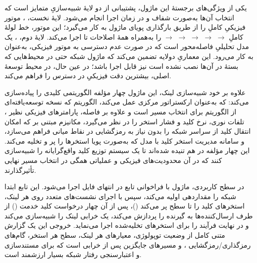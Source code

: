 یکی از ویژگی‌های برجستهٔ این ماژول، پشتیبانی از دو لایهٔ شبیه‌سازیِ متمایز است که انتخاب آن‌ها به‌صورت شفاف و در زمان اجرا انجام می‌شود. لایهٔ نخست، ، موتور فیزیکیِ کاملِ  را از طریق بارگذاری پویای ماژول  به کار می‌گیرد؛ این موتور، خط لولهٔ کاملِ  $\to$  $\to$  $\to$  $\to$  $\to$  را به‌همراه همهٔ اصلاحات  تا  اجرا می‌کند. لایهٔ دوم، ، یک مدل تحلیلیِ فاصله‌محور است که در صورت عدم دسترسی به موتور فیزیکی، به‌عنوان  به کار می‌رود. این معماریِ دولایه تضمین می‌کند که ماژول شبکه حتی در محیط‌هایی که بستهٔ  در آن‌ها نصب نشده است نیز قابل اجرا باشد؛ در عین حال، در محیط توسعهٔ اصلی، بیشترین دقت فیزیکیِ در دسترس را فراهم می‌کند.



علاوه بر خود شبیه‌سازی لینک، این ماژول چهار مؤلفه الگوریتمی کلیدی را پیاده‌سازی می‌کند:  که به‌عنوان ارکستراتور مرکزی عمل می‌کند، الگوریتم  که نسخه توسعه‌یافته‌ای از الگوریتم  برای انتخاب مسیر است و علاوه بر فاصله، پارامترهای فیزیکی نظیر ، تلفات نوری، نرخ کلید و فشار استخر را در نظر می‌گیرد، مکانیزم  مبتنی بر  که امکان انتقال کلید از سراسر شبکه را بدون نیاز به رمزگشایی در نقاط میانی فراهم می‌سازد، و سامانه مدیریت استخر کلید با مدل  که به‌صورت پویا استخرها را پر و تخلیه می‌کند. این چهار مؤلفه در هم تنیده شده‌اند تا یک سیستم توزیع کلید واقع‌گرایانه را شبیه‌سازی کنند که در آن محدودیت‌های فیزیکی و عملیاتی همگی در انتخاب مسیر نهایی تأثیرگذارند.

در سطح کاربردی، ماژول با فراخوانی تابع  در انتهای فایل اجرا می‌شود. این تابع ابتدا شبکه را مقداردهی اولیه می‌کند، سپس با اجرای نشست‌های متعدد  روی هر لینک، استخرهای کلید را تا سطح  پر می‌کند ()، پس از آن چهار درخواست کلید خدمت () از طرف ارسال‌کننده‌ها به گیرنده  را پردازش می‌کند، یک خرابی لینک را شبیه‌سازی می‌کند و در نهایت فرآیند  را برای استخرهای تخلیه‌شده اجرا می‌نماید. خروجی این  یک گزارش متنی کامل از وضعیت توپولوژی، معیارهای هر لینک، سطح هر استخر، گام‌های رمزگذاری/رمزگشایی ، و مسیرهای جایگزین پس از خرابی است که برای مستندسازی و اعتبارسنجی رفتار شبکه بسیار ارزشمند است.

